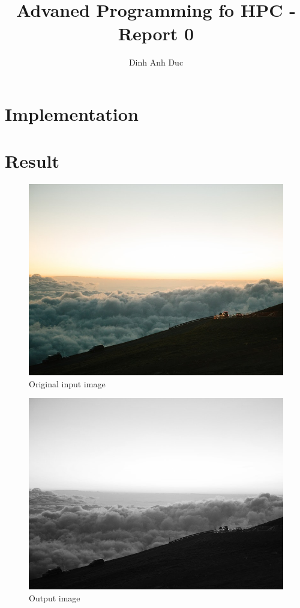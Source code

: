 \documentclass{article}
\title{Advaned Programming fo HPC - Report 0}
\author{Dinh Anh Duc}
\begin{document}
\maketitle

\section*{Implementation}
\section*{Result}
\begin{figure}[h]
\includegraphics[scale=0.3]{./labwork/data/cloud.jpeg}
\caption{Original input image}
\end{figure}
\begin{figure}[h]
\center\includegraphics[scale=0.3]{./labwork/build/labwork3-gpu-out.jpg}
\caption{Output image}
\end{figure}
\end{document}
